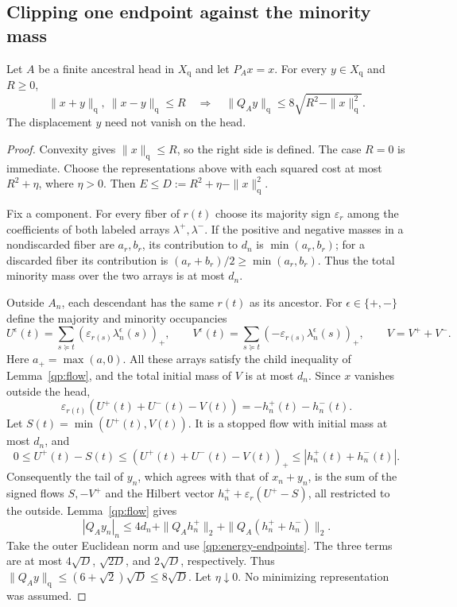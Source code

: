 \subsection{Clipping one endpoint against the minority mass}

\begin{theorem}\label{thm:quadratic-tail}
Let $A$ be a finite ancestral head in $X_{\mathrm q}$ and let
$P_Ax=x$.  For every $y\in X_{\mathrm q}$ and $R\ge0$,
\begin{equation}\label{qp:tail-eight}
 \|x+y\|_{\mathrm q},\ \|x-y\|_{\mathrm q}\le R
 \quad\Longrightarrow\quad
 \|Q_Ay\|_{\mathrm q}\le8\sqrt{R^2-\|x\|_{\mathrm q}^2}.
\end{equation}
The displacement $y$ need not vanish on the head.
\end{theorem}

\begin{proof}
Convexity gives $\|x\|_{\mathrm q}\le R$, so the right side is
defined.  The case $R=0$ is immediate.  Choose the representations
above with each squared cost at most $R^2+\eta$, where $\eta>0$.
Then $E\le D:=R^2+\eta-\|x\|_{\mathrm q}^2$.

Fix a component.  For every fiber of $r(t)$ choose its majority sign
$\varepsilon_r$ among the coefficients of both labeled arrays
$\lambda^+,\lambda^-$.  If the positive and negative masses in a
nondiscarded fiber are $a_r,b_r$, its contribution to $d_n$ is
$\min(a_r,b_r)$; for a discarded fiber its contribution is
$(a_r+b_r)/2\ge\min(a_r,b_r)$.  Thus the total minority mass over
the two arrays is at most $d_n$.

Outside $A_n$, each descendant has the same $r(t)$ as its ancestor.
For $\epsilon\in\{+,-\}$ define the majority and minority
occupancies
\[
 U^\epsilon(t)=\sum_{s\succeq t}(\varepsilon_{r(s)}
                                    \lambda_n^\epsilon(s))_+,
 \qquad
 V^\epsilon(t)=\sum_{s\succeq t}(-\varepsilon_{r(s)}
                                    \lambda_n^\epsilon(s))_+,
 \qquad V=V^++V^-.
\]
Here $a_+=\max(a,0)$.  All these arrays satisfy the child inequality
of Lemma~\ref{qp:flow}, and the total initial mass of $V$ is at most
$d_n$.  Since $x$ vanishes outside the head,
\[
 \varepsilon_{r(t)}(U^+(t)+U^-(t)-V(t))
                       =-h_n^+(t)-h_n^-(t).
\]
Let $S(t)=\min(U^+(t),V(t))$.  It is a stopped flow with initial
mass at most $d_n$, and
\[
 0\le U^+(t)-S(t)
 \le (U^+(t)+U^-(t)-V(t))_+
 \le |h_n^+(t)+h_n^-(t)|.
\]
Consequently the tail of $y_n$, which agrees with that of $x_n+y_n$,
is the sum of the signed flows $S,-V^+$ and the Hilbert vector
$h_n^++\varepsilon_r(U^+-S)$, all restricted to the outside.
Lemma~\ref{qp:flow} gives
\[
 |Q_Ay_n|_n\le4d_n+\|Q_Ah_n^+\|_2+
                              \|Q_A(h_n^++h_n^-)\|_2.
\]
Take the outer Euclidean norm and use
\eqref{qp:energy-endpoints}.  The three terms are at most
$4\sqrt D$, $\sqrt{2D}$, and $2\sqrt D$, respectively.
Thus $\|Q_Ay\|_{\mathrm q}\le(6+\sqrt2)\sqrt D\le8\sqrt D$.
Let $\eta\downarrow0$.  No minimizing representation was assumed.
\end{proof}

